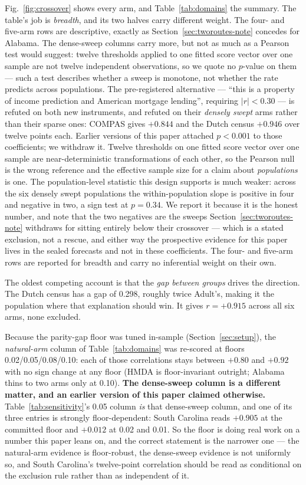 \documentclass[conference]{IEEEtran}
\begin{document}
Fig.~\ref{fig:crossover} shows every arm, and Table~\ref{tab:domains} the summary. The
table's job is \emph{breadth}, and its two halves carry different weight. The four- and
five-arm rows are descriptive, exactly as Section~\ref{sec:tworoutes-note} concedes for
Alabama. The dense-sweep columns carry more, but not as much as a Pearson test would suggest:
twelve thresholds applied to one fitted score vector over one sample are not twelve
independent observations, so we quote no $p$-value on them --- such a test describes whether a
sweep is monotone, not whether the rate predicts across populations. The
pre-registered alternative --- ``this is a property of income prediction and American mortgage
lending'', requiring $|r| < 0.30$ --- is refuted on both new instruments, and refuted on their \emph{densely swept} arms rather than their sparse ones: COMPAS gives
$+0.844$ and the Dutch census $+0.946$ over twelve points each. Earlier versions of this paper
attached $p < 0.001$ to those coefficients; we withdraw it. Twelve thresholds on one fitted
score vector over one sample are near-deterministic transformations of each other, so the
Pearson null is the wrong reference and the effective sample size for a claim about
\emph{populations} is one. The population-level statistic this design supports is much
weaker: across the six densely swept populations the within-population slope is positive in
four and negative in two, a sign test at $p = 0.34$. We report it because it is the honest
number, and note that the two negatives are the sweeps Section~\ref{sec:tworoutes-note}
withdraws for sitting entirely below their crossover --- which is a stated exclusion, not a
rescue, and either way the prospective evidence for this paper lives in the sealed forecasts
and not in these coefficients. The four- and five-arm rows are reported for breadth and carry
no inferential weight on their own.

The oldest competing account is that the \emph{gap between groups} drives the direction. The
Dutch census has a gap of 0.298, roughly twice Adult's, making it the population where that
explanation should win. It gives $r = +0.915$ across all six arms, none excluded.

Because the parity-gap floor was tuned in-sample (Section~\ref{sec:setup}), the
\emph{natural-arm} column of Table~\ref{tab:domains} was re-scored at floors
0.02/0.05/0.08/0.10: each of those correlations stays between $+0.80$ and $+0.92$ with no sign
change at any floor (HMDA is floor-invariant outright; Alabama thins to two arms only at
0.10). \textbf{The dense-sweep column is a different matter, and an earlier version of this
paper claimed otherwise.} Table~\ref{tab:sensitivity}'s 0.05 column \emph{is} that dense-sweep
column, and one of its three entries is strongly floor-dependent: South Carolina reads
$+0.905$ at the committed floor and $+0.012$ at 0.02 and 0.01. So the floor is doing real work
on a number this paper leans on, and the correct statement is the narrower one --- the
natural-arm evidence is floor-robust, the dense-sweep evidence is not uniformly so, and South
Carolina's twelve-point correlation should be read as conditional on the exclusion rule rather
than as independent of it.
\end{document}

